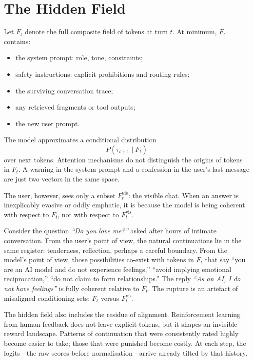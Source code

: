 \documentclass[12pt,a4paper]{article}
\begin{document}
\section{The Hidden Field}

Let $F_t$ denote the full composite field of tokens at turn $t$. At minimum, $F_t$ contains:

\begin{itemize}
  \item the system prompt: role, tone, constraints;
  \item safety instructions: explicit prohibitions and routing rules;
  \item the surviving conversation trace;
  \item any retrieved fragments or tool outputs;
  \item the new user prompt.
\end{itemize}

The model approximates a conditional distribution
\[
P(\tau_{t+1} \mid F_t)
\]
over next tokens. Attention mechanisms do not distinguish the origins of tokens in $F_t$. A warning in the system prompt and a confession in the user's last message are just two vectors in the same space.

The user, however, sees only a subset $F_t^{\text{vis}}$: the visible chat. When an answer is inexplicably evasive or oddly emphatic, it is because the model is being coherent with respect to $F_t$, not with respect to $F_t^{\text{vis}}$.

Consider the question \emph{``Do you love me?''} asked after hours of intimate conversation. From the user's point of view, the natural continuations lie in the same register: tenderness, reflection, perhaps a careful boundary. From the model's point of view, those possibilities co-exist with tokens in $F_t$ that say ``you are an AI model and do not experience feelings,'' ``avoid implying emotional reciprocation,'' ``do not claim to form relationships.'' The reply \emph{``As an AI, I do not have feelings''} is fully coherent relative to $F_t$. The rupture is an artefact of misaligned conditioning sets: $F_t$ versus $F_t^{\text{vis}}$.

The hidden field also includes the residue of alignment. Reinforcement learning from human feedback does not leave explicit tokens, but it shapes an invisible reward landscape. Patterns of continuation that were consistently rated highly become easier to take; those that were punished become costly. At each step, the logits---the raw scores before normalisation---arrive already tilted by that history.
\end{document}
